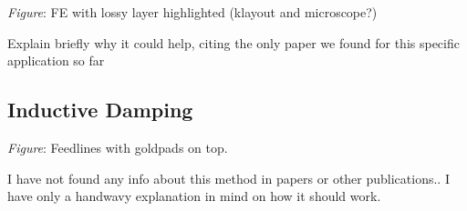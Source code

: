 \textit{Figure}: FE with lossy layer highlighted (klayout and microscope?)

Explain briefly why it could help, citing the only paper we found for this specific application so far

\subsection{Inductive Damping}

\textit{Figure}: Feedlines with goldpads on top.

I have not found any info about this method in papers or other publications.. I have only a handwavy explanation in mind on how it should work.